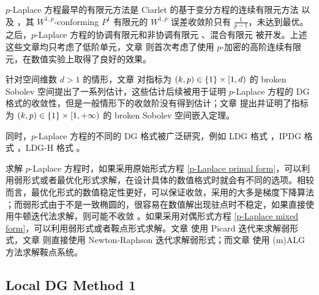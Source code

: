\(p\)-Laplace 方程最早的有限元方法是 Ciarlet 的基于变分方程的连续有限元方法 \cite{10.1137/1.9780898719208.ch5} 以及 \cite{10.1051/m2an/197509R200411}，其 \(W^{1,p}\)-conforming \(P^1\) 有限元的 \(W^{1,p}\) 误差收敛阶只有 \(\frac{1}{p-1}\)，未达到最优。之后，\(p\)-Laplace 方程的协调有限元和非协调有限元 \cite{10.1137/S0036142901393589, 10.1016/j.apnum.2019.11.018, 10.4208/aamm.OA-2018-0117, 10.1007/s00211-005-0594-5, 10.1093/imanum/drr016, AINSWORTH2000329, 10.1137/070681508}、混合有限元 \cite{10.1093/imanum/18.1.121, 10.1216/camq/1008957338, 10.1016/j.cma.2006.11.023}被开发。上述这些文章均只考虑了低阶单元，文章 \cite{10.1007/s002110050423} 则首次考虑了使用 \(p\)-加密的高阶连续有限元，在数值实验上取得了良好的效果。

针对空间维数 \(d > 1\) 的情形，文章 \cite{10.1093/imanum/drn038} 对指标为 \((k, p) \in \left\{1\right\} \times [1, d)\) 的 broken Sobolev 空间提出了一系列估计，这些估计后续被用于证明 \(p\)-Laplace 方程的 DG 格式的收敛性，但是一般情形下的收敛阶没有得到估计；文章 \cite[Theorem 6.1]{10.1090/S0025-5718-10-02333-1} 提出并证明了指标为 \((k, p) \in \left\{1\right\} \times [1, +\infty)\) 的 broken Sobolev 空间嵌入定理。

同时，\(p\)-Laplace 方程的不同的 DG 格式被广泛研究，例如 LDG 格式 \cite{10.1093/imanum/drt040, 10.1002/fld.3955, 10.1016/j.crma.2008.07.005, IJNAM-19-315}，IPDG 格式 \cite{10.1016/j.finel.2014.11.001, 10.1137/110820324}，LDG-H 格式 \cite{10.1137/15M1008014, 10.1007/s10915-019-00967-6}。

求解 \(p\)-Laplace 方程时，如果采用原始形式方程 \eqref{p-Laplace primal form}，可以利用弱形式或者最优化形式求解，在设计具体的数值格式时就会有不同的选项。相较而言，最优化形式的数值稳定性更好，可以保证收敛，采用的大多是梯度下降算法 \cite{10.1090/S0025-5718-1993-1192966-4, 10.1137/S1064827598339098, 10.1007/s10915-007-9134-z, IJNAM-2-123, 10.1016/j.amc.2013.07.096,10.1137/15M1008014}；而弱形式由于不是一致椭圆的，很容易在数值解出现驻点时不稳定，如果直接使用牛顿迭代法求解，则可能不收敛 \cite{10.1051/m2an/197509R200411}。如果采用对偶形式方程 \eqref{p-Laplace mixed form}，可以利用弱形式或者鞍点形式求解。文章 \cite{10.1016/j.cma.2006.11.023} 使用 Picard 迭代来求解弱形式，文章 \cite{10.1002/fld.3955} 则直接使用 Newton-Raphson 迭代求解弱形式；而文章 \cite{10.1137/16M1067792} 使用 (m)ALG 方法求解鞍点系统。


\subsection{Local DG Method 1}

